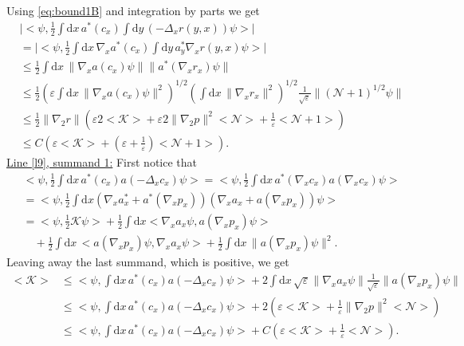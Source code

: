 \documentclass[11pt,a4paper,draft,DIV11]{scrartcl}	%
\newcommand{\di}{\textrm{d}}		%
\newcommand{\Ncal}{\mathcal{N}}		%
\newcommand{\Kcal}{\mathcal{K}}		%
\newcommand{\estlist}[2]{\underline{Line \ref{l#1}, summand #2:}}
\newcommand{\scal}[2]{\big<#1,#2\big>} %
\newcommand{\norm}[1]{\lVert#1\rVert}	%
\newcommand{\ev}[1]{\big<#1\big>}	%
\newcommand{\gradone}{\nabla_2}
\begin{document}
Using \eqref{eq:bound1B} and integration by parts we get
\begin{align*}
& \lvert \scal{\psi}{\frac{1}{2}\int \di x\, a^\ast(c_x) \int \di y\, (-\Delta_x r(y,x))\psi} \rvert \\
& = \lvert \scal{\psi}{\frac{1}{2}\int \di x\, \nabla_x a^\ast(c_x) \int \di y\, a^\ast_y \nabla_x r(y,x) \psi}\rvert \\
& \leq \frac{1}{2}\int \di x\, \norm{\nabla_x a(c_x)\psi} \norm{a^\ast(\nabla_x r_x)\psi} \\
& \leq \frac{1}{2}\left( \varepsilon \int \di x\, \norm{\nabla_x a(c_x) \psi}^2 \right)^{1/2} \left( \int \di x\, \norm{\nabla_x r_x}^2 \right)^{1/2} \frac{1}{\sqrt{\varepsilon}} \norm{(\Ncal+1)^{1/2}\psi} \\
& \leq \frac{1}{2}\norm{\gradone r} \left( \varepsilon 2\ev{\Kcal} + \varepsilon 2 \norm{\gradone p}^2 \ev{\Ncal} + \frac{1}{\varepsilon}\ev{\Ncal+1} \right) \\
& \leq C \left( \varepsilon \ev{\Kcal} + (\varepsilon+\frac{1}{\varepsilon})\ev{\Ncal+1} \right).
\end{align*}
\estlist{9}{1}
First notice that
\begin{align*}
 & \scal{\psi}{\frac{1}{2}\int \di x\, a^\ast(c_x) a(-\Delta_x c_x)\psi} = \scal{\psi}{\frac{1}{2}\int \di x\, a^\ast(\nabla_x c_x)a(\nabla_x c_x)\psi} \\
& = \scal{\psi}{\frac{1}{2}\int \di x \left( \nabla_x a^\ast_x + a^\ast(\nabla_x p_x) \right)\left(  \nabla_x a_x + a(\nabla_x p_x) \right) \psi} \\
& = \scal{\psi}{\frac{1}{2}\Kcal \psi} + \frac{1}{2}\int \di x\scal{\nabla_x
a_x \psi}{a(\nabla_x p_x)\psi} \\
& \quad + \frac{1}{2}\int \di x\, \scal{a(\nabla_x p_x)\psi}{\nabla_x a_x \psi} + \frac{1}{2}\int \di x\, \norm{a(\nabla_x p_x)\psi}^2.
\end{align*}
Leaving away the last summand, which is positive, we get
\begin{equation}
\label{eq:bound1A}
\begin{split}
 \ev{\Kcal} & \leq \scal{\psi}{\int \di x\, a^\ast(c_x) a(-\Delta_x c_x)\psi} + 2\int \di x\, \sqrt{\varepsilon} \norm{\nabla_x a_x \psi} \frac{1}{\sqrt{\varepsilon}} \norm{a(\nabla_x p_x)\psi} \\
& \leq \scal{\psi}{\int \di x\, a^\ast(c_x) a(-\Delta_x c_x)\psi} + 2\left( \varepsilon \ev{\Kcal} + \frac{1}{\varepsilon}  \norm{\gradone p}^2 \ev{\Ncal}\right) \\
& \leq \scal{\psi}{\int \di x\,a^\ast(c_x) a(-\Delta_x c_x)\psi} + C\left( \varepsilon \ev{\Kcal} + \frac{1}{\varepsilon}\ev{\Ncal} \right).
\end{split}
\end{equation}
\end{document}
